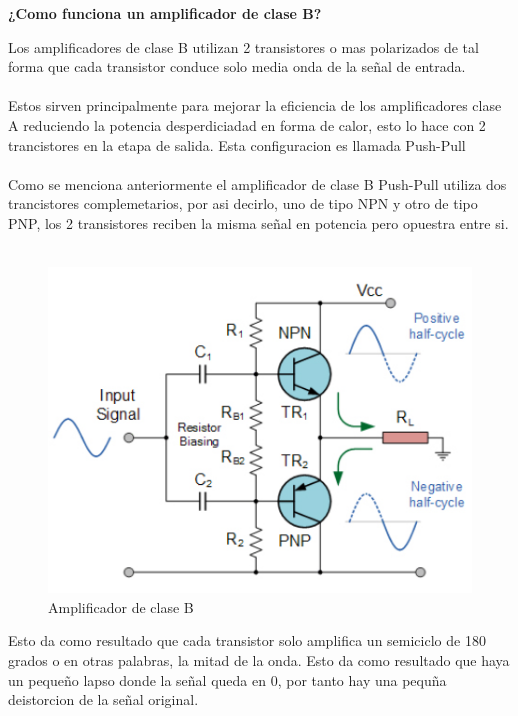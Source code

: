 \documentclass[letterpaper]{article}
\begin{document}
    \begin{large}
        \begin{center}
            \textbf{¿Como funciona un amplificador de clase B?}
        \end{center}
        Los amplificadores de clase B utilizan 2 transistores o mas polarizados de tal forma que cada transistor conduce solo media onda de la señal de entrada.\\\\
        Estos sirven principalmente para mejorar la eficiencia de los amplificadores clase A reduciendo la potencia desperdiciadad en forma de calor, esto lo hace con 2 trancistores en la etapa de salida. Esta configuracion es llamada Push-Pull\\\\
        Como se menciona anteriormente el amplificador de clase B Push-Pull utiliza dos trancistores complemetarios, por asi decirlo, uno de tipo NPN y otro de tipo PNP, los 2 transistores reciben la misma señal en potencia pero opuestra entre si.\\\\
        \begin{figure}[htbp]
          \centering
          \includegraphics[scale=0.5]{IMG/AmpB.jpg}
          \caption{Amplificador de clase B}
        \end{figure}
        Esto da como resultado que cada transistor solo amplifica un semiciclo de 180 grados o en otras palabras, la mitad de la onda. Esto da como resultado que haya un pequeño lapso donde la señal queda en 0, por tanto hay una pequña deistorcion de la señal original.\\
        \begin{center}

\end{center}
\end{large}
\end{document}
